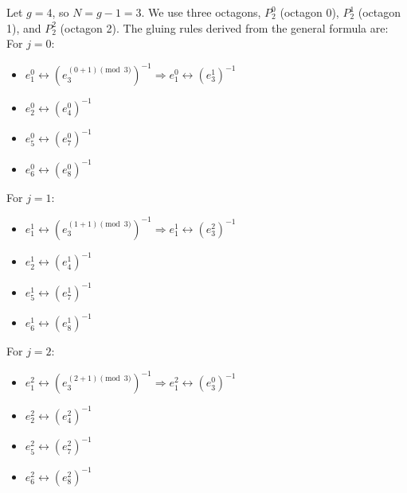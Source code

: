 \documentclass{article}
\theoremstyle{definition}
\theoremstyle{remark}
\begin{document}
Let $g=4$, so $N=g-1=3$. We use three octagons, $P_2^0$ (octagon 0), $P_2^1$ (octagon 1), and $P_2^2$ (octagon 2). The gluing rules derived from the general formula are:
For $j=0$:
\begin{itemize}
    \item $e_1^0 \leftrightarrow (e_3^{(0+1)\pmod 3})^{-1} \Rightarrow e_1^0 \leftrightarrow (e_3^1)^{-1}$
    \item $e_2^0 \leftrightarrow (e_4^0)^{-1}$
    \item $e_5^0 \leftrightarrow (e_7^0)^{-1}$
    \item $e_6^0 \leftrightarrow (e_8^0)^{-1}$
\end{itemize}
For $j=1$:
\begin{itemize}
    \item $e_1^1 \leftrightarrow (e_3^{(1+1)\pmod 3})^{-1} \Rightarrow e_1^1 \leftrightarrow (e_3^2)^{-1}$
    \item $e_2^1 \leftrightarrow (e_4^1)^{-1}$
    \item $e_5^1 \leftrightarrow (e_7^1)^{-1}$
    \item $e_6^1 \leftrightarrow (e_8^1)^{-1}$
\end{itemize}
For $j=2$:
\begin{itemize}
    \item $e_1^2 \leftrightarrow (e_3^{(2+1)\pmod 3})^{-1} \Rightarrow e_1^2 \leftrightarrow (e_3^0)^{-1}$
    \item $e_2^2 \leftrightarrow (e_4^2)^{-1}$
    \item $e_5^2 \leftrightarrow (e_7^2)^{-1}$
    \item $e_6^2 \leftrightarrow (e_8^2)^{-1}$
\end{itemize}
\end{document}
